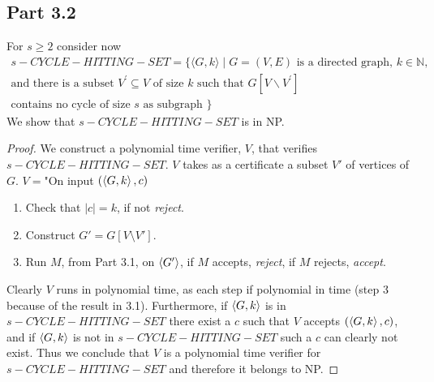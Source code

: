 \documentclass[a4paper,11pt]{article}
\newcommand{\abs}[1]{\left\lvert #1 \right\rvert}
\numberwithin{equation}{section}
\begin{document}
	\subsection*{Part 3.2}
	For $ s\geq2 $ consider now
	\begin{equation*}
		\begin{aligned}
		s-C Y C L E-H I T T I N G-S E T=\{\langle G, k\rangle \mid G=(V, E)\text{ is a directed graph, $k \in \mathbb{N}$,}\\ \text{and there is
		a subset $V^{\prime} \subseteq V$ of size $k$ such that $G\left[V \backslash V^{\prime}\right]$}\\ \text{
		contains no cycle of size $s$ as subgraph }\}
		\end{aligned}
	\end{equation*}
	We show that $ s-C Y C L E-H I T T I N G-S E T $ is in NP.
	\begin{proof}
		We construct a polynomial time verifier, $ V $, that verifies $ s-C Y C L E-H I T T I N G-S E T $. $ V $ takes as a certificate a subset $ V' $ of vertices of $ G $. $ V= $"On input $ (\braket{G,k},c) $\begin{enumerate}
			\item Check that $ \abs{c}=k $, if not \emph{reject}.
			\item Construct $ G'=G[V\setminus V'] $.
			\item Run $ M $, from Part 3.1, on $ \braket{G'} $, if $ M $ accepts, \emph{reject}, if  $ M $ rejects, \emph{accept}.
		\end{enumerate}
		Clearly $ V $ runs in polynomial time, as each step if polynomial in time (step 3 because of the result in 3.1). Furthermore, if $ \braket{G,k} $ is in $ s-C Y C L E-H I T T I N G-S E T $ there exist a $ c $ such that $ V $ accepts $ (\braket{G,k},c) $, and if $ \braket{G,k} $ is not in $ s-C Y C L E-H I T T I N G-S E T $ such a $ c $ can clearly not exist. Thus we conclude that $ V$ is a polynomial time verifier for $ s-C Y C L E-H I T T I N G-S E T $ and therefore it belongs to NP.
	\end{proof}
	
\end{document}
